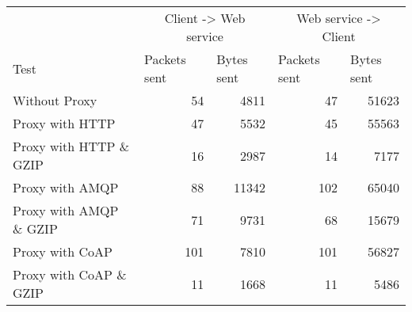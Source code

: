 \begin{tabular}{lrrrr}
\hline
\multicolumn{1}{l}{}                  & \multicolumn{2}{c}{Client -> Web service}                           & \multicolumn{2}{c}{Web service -> Client}                           \\
\multicolumn{1}{l}{Test} & \multicolumn{1}{l}{Packets sent} & \multicolumn{1}{l}{Bytes sent} & \multicolumn{1}{l}{Packets sent} & \multicolumn{1}{l}{Bytes sent} \\ \hline
Without Proxy                   & 54             & 4811           & 47             & 51623          \\
Proxy with HTTP                 & 47             & 5532           & 45             & 55563          \\
Proxy with HTTP \& GZIP         & 16             & 2987           & 14             & 7177           \\
Proxy with AMQP                 & 88             & 11342          & 102            & 65040          \\
Proxy with AMQP \& GZIP         & 71             & 9731           & 68             & 15679          \\
Proxy with CoAP                 & 101            & 7810           & 101            & 56827          \\
Proxy with CoAP \& GZIP         & 11             & 1668           & 11             & 5486           \\
\end{tabular}